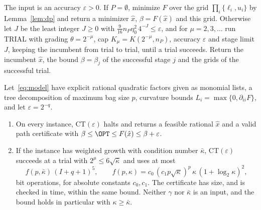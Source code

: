 \begin{algorithm}\label{alg:ct}
The input is an accuracy $\varepsilon>0$. If $P=\emptyset$, minimize $F$
over the grid $\prod_i\{\ell_i,u_i\}$ by Lemma~\ref{lem:dp} and return a
minimizer $\hat x$, $\beta=F(\hat x)$ and this grid. Otherwise let $J$ be
the least integer $J\ge0$ with $\frac9{16}n_P\eta_0^2\,4^{-J}\le\varepsilon$,
and for
$\mu=2,3,\dots$ run TRIAL with grading $\theta=2^{-\mu}$, cap
$K_\mu=K(2^{-\mu},n_P)$, accuracy $\varepsilon$ and stage limit $J$, keeping
the incumbent from trial to trial, until a trial succeeds. Return the
incumbent $\hat x$, the bound $\beta=\beta_j$ of the successful stage $j$ and
the grids of the successful trial.
\end{algorithm}

\begin{theorem}\label{thm:approx}
Let~\eqref{eq:model} have explicit rational quadratic factors given as
monomial lists, a tree decomposition of maximum bag size $p$, curvature bounds
$L_i=\max\{0,\partial_{ii}F\}$, and let $\varepsilon=2^{-q}$.
\begin{enumerate}[label=(\alph*)]
\item On every instance, CT$(\varepsilon)$ halts and returns a feasible
rational $\hat x$ and a valid path certificate with
$\beta\le\OPT\le F(\hat x)\le\beta+\varepsilon$.
\item If the instance has weighted growth with condition number $\bar\kappa$,
CT$(\varepsilon)$ succeeds at a trial with $2^\mu\le6\sqrt{\bar\kappa}$ and
uses at most
\[
f(p,\bar\kappa)\,(I+q+1)^5,\qquad
f(p,\kappa)=c_0\,(c_1p\sqrt\kappa)^p\,\kappa\,(1+\log_2\kappa)^2,
\]
bit operations, for absolute constants $c_0,c_1$. The certificate has size,
and is checked in time, within the same bound. Neither $\gamma$ nor
$\bar\kappa$ is an input, and the bound holds in particular with
$\kappa\ge\bar\kappa$.
\end{enumerate}
\end{theorem}

